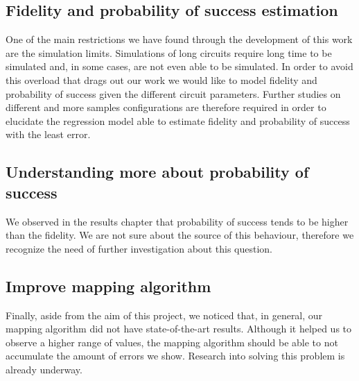 \subsection{Fidelity and probability of success estimation}
\label{sec:orgf1b0bfe}

One of the main restrictions we have found through the development of this work are the simulation limits.
Simulations of long circuits require long time to be simulated and, in some cases, are not even able to be simulated.
In order to avoid this overload that drags out our work we would like to model fidelity and probability of success given the different circuit parameters.
Further studies on different and more samples configurations are therefore required in order to elucidate the regression model able to estimate fidelity and probability of success with the least error.

\subsection{Understanding more about probability of success}
\label{sec:orgbdc5ccb}

We observed in the results chapter that probability of success tends to be higher than the fidelity.
We are not sure about the source of this behaviour, therefore we recognize the need of further investigation about this question.

\subsection{Improve mapping algorithm}
\label{sec:org45071cf}

Finally, aside from the aim of this project, we noticed that, in general, our mapping algorithm did not have state-of-the-art results.
Although it helped us to observe a higher range of values, the mapping algorithm should be able to not accumulate the amount of errors we show.
Research into solving this problem is already underway.
